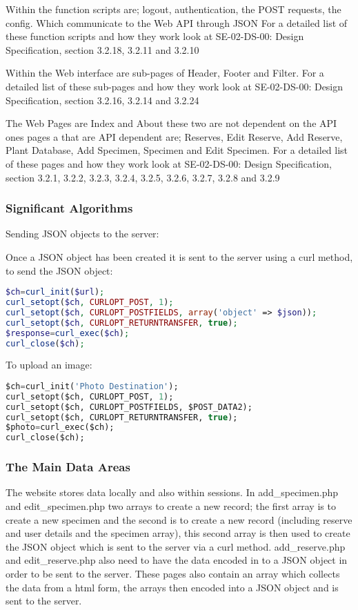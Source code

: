         Within the function scripts are; logout, authentication, the  POST requests, the config. Which communicate to the Web API through JSON For a detailed list of these function scripts and how they work look at SE-02-DS-00: Design Specification, section 3.2.18, 3.2.11 and 3.2.10
    
        Within the Web interface are sub-pages of Header, Footer and Filter. For a detailed list of these sub-pages and how they work look at SE-02-DS-00: Design Specification, section 3.2.16, 3.2.14 and 3.2.24
    
        The Web Pages are Index and About these two are not dependent on the API ones pages a that are API dependent are; Reserves, Edit Reserve, Add Reserve, Plant Database, Add Specimen, Specimen and Edit Specimen. For a detailed list of these pages and how they work look at SE-02-DS-00: Design Specification, section 3.2.1, 3.2.2, 3.2.3, 3.2.4, 3.2.5, 3.2.6, 3.2.7, 3.2.8 and 3.2.9

    \subsubsection{Significant Algorithms}
        Sending JSON objects to the server:

        Once a JSON object has been created it is sent to the server using a curl method, to send the JSON object:

        \begin{lstlisting}[language=php]
$ch=curl_init($url);
curl_setopt($ch, CURLOPT_POST, 1);
curl_setopt($ch, CURLOPT_POSTFIELDS, array('object' => $json));
curl_setopt($ch, CURLOPT_RETURNTRANSFER, true);
$response=curl_exec($ch);
curl_close($ch);
        \end{lstlisting}

        To upload an image:
        \begin{lstlisting}[language=sql]
$ch=curl_init('Photo Destination');
curl_setopt($ch, CURLOPT_POST, 1);
curl_setopt($ch, CURLOPT_POSTFIELDS, $POST_DATA2);
curl_setopt($ch, CURLOPT_RETURNTRANSFER, true);
$photo=curl_exec($ch);
curl_close($ch); 
        \end{lstlisting}
    
    \subsubsection{The Main Data Areas}
        The website stores data locally and also within sessions. In add\_specimen.php and edit\_specimen.php two arrays to create a new record; the first array is to create a new specimen and the second is to create a new record (including reserve and user details and the specimen array), this second array is then used to create the JSON object which is sent to the server via a curl method. add\_reserve.php and edit\_reserve.php also need to have the data encoded in to a JSON object in order to be sent to the server. These pages also contain an array which collects the data from a html form, the arrays then encoded into a JSON object and is sent to the server. 

